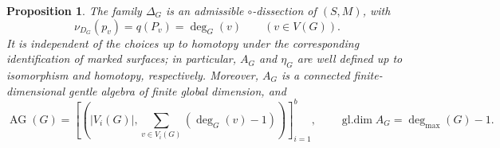 \documentclass[11pt]{amsart}
\theoremstyle{definition}
\theoremstyle{plain}
\newtheorem{proposition}[proposition]{Proposition}
\theoremstyle{definition}
\theoremstyle{definition}
\newcommand{\gldim}{\operatorname{gl.dim}}
\newcommand{\degmax}{\deg_{\max}}
\newcommand{\AG}{\operatorname{AG}}
\begin{document}
\begin{proposition}
\label{prop:ribbon-reconstruction}
The family $\Delta_G$ is an admissible $\circ$-dissection of $(S,M)$, with
\begin{equation}
\label{eq:ribbon-dual-degrees}
  \nu_{D_G}(p_v)=q(P_v)=\deg_G(v)
  \qquad(v\in V(G)).
\end{equation}
It is independent of the choices up to homotopy under the corresponding
identification of marked surfaces; in particular, $A_G$ and $\eta_G$ are
well defined up to isomorphism and homotopy, respectively.
Moreover, $A_G$ is a connected finite-dimensional gentle algebra of
finite global dimension, and
\begin{equation}
\label{eq:ribbon-AAG-gldim}
  \AG(G)=
  \left[
    \left(|V_i(G)|,\sum_{v\in V_i(G)}(\deg_G(v)-1)\right)
  \right]_{i=1}^b,
  \qquad
  \gldim A_G=\degmax(G)-1.
\end{equation}
\end{proposition}
\end{document}
